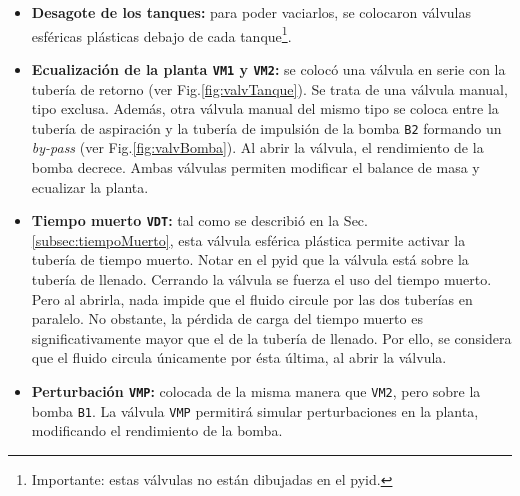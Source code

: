 \begin{itemize}
  \item \textbf{Desagote de los tanques:}
  para poder vaciarlos, se colocaron válvulas esféricas plásticas debajo de
cada tanque\footnote{Importante: estas válvulas no están dibujadas en el
\gls{pyid}.}.

  \item \textbf{Ecualización de la planta \texttt{VM1} y \texttt{VM2}:} se
colocó una válvula en serie con la tubería de retorno (ver
Fig.\ref{fig:valvTanque}).
Se trata de una
válvula manual, tipo exclusa.
Además, otra válvula manual del mismo tipo se coloca entre la tubería de
aspiración y
la tubería de impulsión de la bomba \verb|B2| formando un \emph{by-pass} (ver
Fig.\ref{fig:valvBomba}).
Al abrir la válvula, el rendimiento de la bomba decrece.
  Ambas válvulas permiten modificar el balance de masa y ecualizar la planta.

  \item \textbf{Tiempo muerto \texttt{VDT}:}
  tal como se describió en la Sec. \ref{subsec:tiempoMuerto}, esta válvula
esférica plástica permite activar la tubería de tiempo muerto.
  Notar en el \gls{pyid} que la válvula está sobre la tubería de llenado.
  Cerrando la válvula se fuerza el uso del tiempo muerto. Pero al
abrirla, nada impide que el fluido circule por las dos tuberías en paralelo.
  No obstante, la pérdida de carga del tiempo muerto es significativamente
mayor que el de la tubería de llenado.
  Por ello, se considera que el fluido circula únicamente por ésta última, al
abrir la válvula.

  \item \textbf{Perturbación \texttt{VMP}:}
  colocada de la misma manera que \verb|VM2|, pero sobre la bomba \verb|B1|.
  La válvula \verb|VMP| permitirá simular perturbaciones en la planta,
modificando el rendimiento de la bomba.

\end{itemize}

